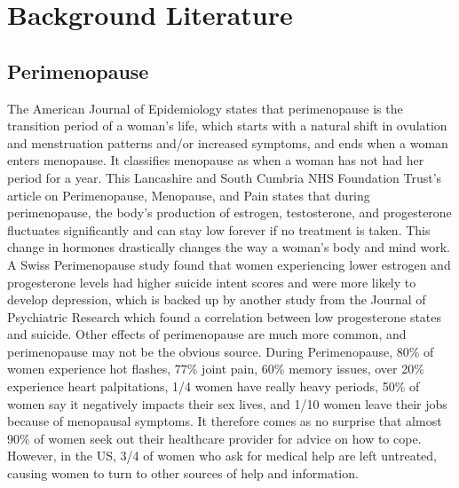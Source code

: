 \section{Background Literature}\label{backg}

\subsection{Perimenopause}
The American Journal of Epidemiology\cite{Brambilla1994} states that perimenopause is the transition period of a woman's life, which starts with a natural shift in ovulation and menstruation patterns and/or increased symptoms, and ends when a woman enters menopause. It classifies menopause as when a woman has not had her period for a year. This Lancashire and South Cumbria NHS Foundation Trust's article on Perimenopause, Menopause, and Pain\cite{LSCFT2024} states that during perimenopause, the body's production of estrogen, testosterone, and progesterone fluctuates significantly and can stay low forever if no treatment is taken. This change in hormones drastically changes the way a woman's body and mind work. A Swiss Perimenopause study\cite{Willi2021} found that women experiencing lower estrogen and progesterone levels had higher suicide intent scores and were more likely to develop depression, which is backed up by another study from the Journal of Psychiatric Research which found a correlation between low progesterone states and suicide\cite{BACAGARCIA2010209}. Other effects of perimenopause are much more common, and perimenopause may not be the obvious source. During Perimenopause, 80\% of women experience hot flashes\cite{Bansal2019}, 77\% joint pain\cite{ScienceDaily2013}, 60\% memory issues\cite{Gaytri2018}, over 20\% experience heart palpitations\cite{Sheng2021}, 1/4 women have really heavy periods\cite{Harlow2011}, 50\% of women say it negatively impacts their sex lives\cite{BMS2016}, and 1/10 women leave their jobs because of menopausal symptoms\cite{Brewis2017}. It therefore comes as no surprise that almost 90\% of women seek out their healthcare provider for advice on how to cope\cite{Guthrie2003}. However, in the US, 3/4 of women who ask for medical help are left untreated, causing women to turn to other sources of help and information\cite{Wolff2018}. 

